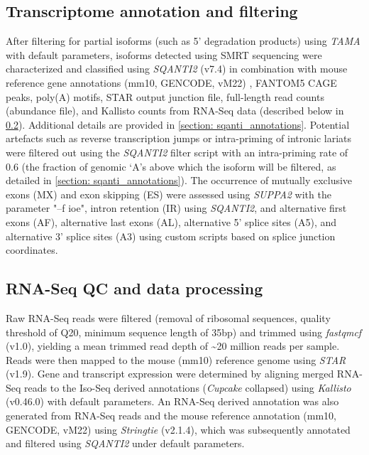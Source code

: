\subsection{Transcriptome annotation and filtering}
\label{ch4: transcriptome_annotation}
After filtering for partial isoforms (such as 5’ degradation products) using \textit{TAMA} with default parameters, isoforms detected using SMRT sequencing were characterized and classified using \textit{SQANTI2} (v7.4) in combination with mouse reference gene annotations (mm10, GENCODE, vM22) , FANTOM5 CAGE peaks, poly(A) motifs, STAR output junction file, full-length read counts (abundance file), and Kallisto counts from RNA-Seq data (described below in \cref{ch4: rnaseq_processing}). Additional details are provided in \cref{section: sqanti_annotations}. Potential artefacts such as reverse transcription jumps or intra-priming of intronic lariats were filtered out using the \textit{SQANTI2} filter script with an intra-priming rate of 0.6 (the fraction of genomic ‘A's above which the isoform will be filtered, as detailed in \cref{section: sqanti_annotations}). The occurrence of mutually exclusive exons (MX) and exon skipping (ES) were assessed using \textit{SUPPA2}\cite{Trincado2018} with the parameter "–f ioe", intron retention (IR) using \textit{SQANTI2}, and alternative first exons (AF), alternative last exons (AL), alternative 5’ splice sites (A5), and alternative 3’ splice sites (A3) using custom scripts based on splice junction coordinates. 

\subsection{RNA-Seq QC and data processing}
\label{ch4: rnaseq_processing}
Raw RNA-Seq reads were filtered (removal of ribosomal sequences, quality threshold of Q20, minimum sequence length of 35bp) and trimmed using \textit{fastqmcf} (v1.0), yielding a mean trimmed read depth of \textasciitilde20 million reads per sample. Reads were then mapped to the mouse (mm10) reference genome using \textit{STAR}\cite{Dobin2013} (v1.9). Gene and transcript expression were determined by aligning merged RNA-Seq reads to the Iso-Seq derived annotations (\textit{Cupcake} collapsed) using \textit{Kallisto}\cite{Bray2016} (v0.46.0) with default parameters. An RNA-Seq derived annotation was also generated from RNA-Seq reads and the mouse reference annotation (mm10, GENCODE, vM22) using \textit{Stringtie}\cite{Pertea2015} (v2.1.4), which was subsequently annotated and filtered using \textit{SQANTI2} under default parameters. 

